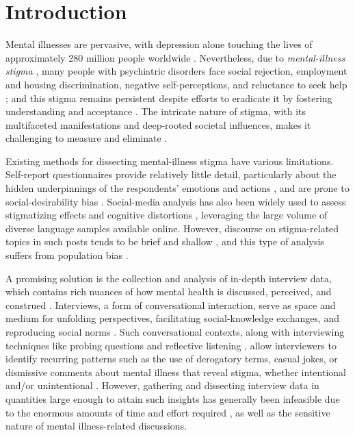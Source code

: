 \section{Introduction}


Mental illnesses are pervasive, with depression alone touching the lives of approximately 280 million people worldwide \cite{WHO_depression_2023}.
Nevertheless, due to \textit{mental-illness stigma} \cite{intervention_corrigan_1999}, many people with psychiatric disorders face social rejection, employment and housing discrimination, negative self-perceptions, and reluctance to seek help \cite{depression_stigma_peluso_2009, seek_help_reluctant_clement_2015}; and this stigma remains persistent despite efforts to eradicate it by fostering understanding and acceptance \cite{intervention_corrigan_1999}. 
The intricate nature of stigma, with its multifaceted manifestations and deep-rooted societal influences, makes it challenging to measure and eliminate \cite{attribution_theory_corrigan_2000}.



Existing methods for dissecting mental-illness stigma have various limitations. 
Self-report questionnaires \cite{attribution_model_corrigan_2003} provide relatively little detail, particularly about the hidden underpinnings of the respondents' emotions and actions \cite{comparison_taherdoost_2022}, and are prone to social-desirability bias \cite{sd_scale_inaccurate_furnham_1986}.
Social-media analysis has also been widely used to assess stigmatizing effects and cognitive distortions \cite{detect_method_fang_2023, detect_method_mittal_2023}, leveraging the large volume of diverse language samples available online. 
However, discourse on stigma-related topics in such posts tends to be brief and shallow \cite{social_media_decontext_boyd_2012}, and this type of analysis suffers from population bias \cite{social_media_deidentify_ruths_2014}.



A promising solution is the collection and analysis of in-depth interview data, which contains rich nuances of how mental health is discussed, perceived, and construed \cite{interview_stigma_measure_liggins_2005, interview_stigma_measure_lyons_1995}.
Interviews, a form of conversational interaction, serve as space and medium for unfolding perspectives, facilitating social-knowledge exchanges, and reproducing social norms \cite{conversation_importance_jenlink_2005, sensitive_kvale_2009}.
Such conversational contexts, along with interviewing techniques like probing questions and reflective listening \cite{sensitive_kvale_2009}, allow interviewers to identify recurring patterns such as the use of derogatory terms, casual jokes, or dismissive comments about mental illness that reveal stigma, whether intentional and/or unintentional \cite{conversation_importance_meredith_2019, microaggression_stigma_gonzales_2015}. 
However, gathering and dissecting interview data in quantities large enough to attain such insights has generally been infeasible due to the enormous amounts of time and effort required \cite{coding_manual_saldana_2016}, as well as the sensitive nature of mental illness-related discussions.




